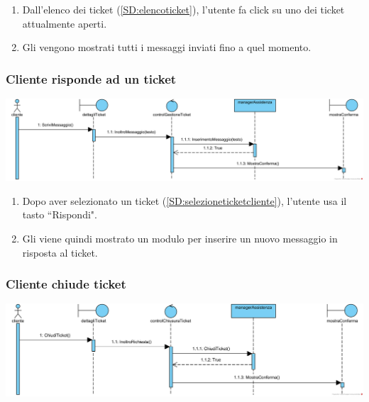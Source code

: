 \documentclass[12pt,a4paper]{article}
\begin{document}
\begin{enumerate}
\item Dall'elenco dei ticket (\ref{SD:elencoticket}), l'utente fa click su uno dei ticket attualmente aperti.
\item Gli vengono mostrati tutti i messaggi inviati fino a quel momento.
\end{enumerate}

\newpage

\subsubsection{Cliente risponde ad un ticket}
\label{SD:rispostaticketcliente}

\begin{center}
\includegraphics[width=\textwidth]{SequenceDiagram/ClienteTicketRisponde}
\end{center}

\begin{enumerate}
\item Dopo aver selezionato un ticket (\ref{SD:selezioneticketcliente}), l'utente usa il tasto ``Rispondi".
\item Gli viene quindi mostrato un modulo per inserire un nuovo messaggio in risposta al ticket.
\end{enumerate}

\subsubsection{Cliente chiude ticket}
\label{SD:chiusuraticket}

\begin{center}
\includegraphics[width=\textwidth]{SequenceDiagram/ClienteTicketChiusura}
\end{center}
\end{document}
